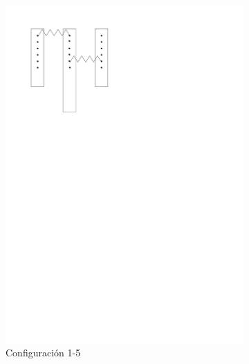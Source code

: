 \begin{figure}[htbp!]
	\centering
	\begin{subfigure}[b]{0.3\textwidth}
		\centering
		\includegraphics[width=\linewidth]{./Figures/15.pdf}
		\caption{Configuración 1-5}
		\label{fig:conf-1-5}
	\end{subfigure}
	\hfill
	\begin{subfigure}[b]{0.3\textwidth}
		\centering

\end{subfigure}
\end{figure}
